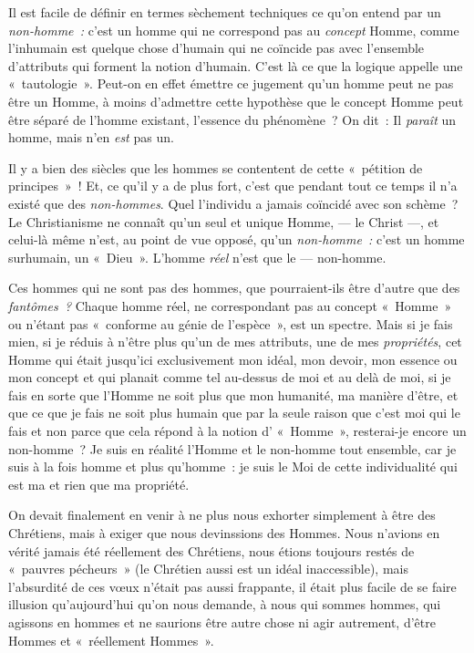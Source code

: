 \documentclass[french,twoside]{book} %
\begin{document}
Il est facile de définir en termes sèchement techniques ce qu’on entend par un \emph{non-homme :} c’est un homme qui ne correspond pas au \emph{concept} Homme, comme l’inhumain est quelque chose d’humain qui ne coïncide pas avec l’ensemble d’attributs qui forment la notion d’humain. C’est là ce que la logique appelle une « tautologie ». Peut-on en effet émettre ce jugement  qu’un homme peut ne pas être un Homme, à moins d’admettre cette hypothèse que le concept Homme peut être séparé de l’homme existant, l’essence du phénomène ? On dit : Il \emph{paraît} un homme, mais n’en \emph{est} pas un.\par
Il y a bien des siècles que les hommes se contentent de cette « pétition de principes » ! Et, ce qu’il y a de plus fort, c’est que pendant tout ce temps il n’a existé que des \emph{non-hommes}. Quel l’individu a jamais coïncidé avec son schème ? Le Christianisme ne connaît qu’un seul et unique Homme, — le Christ —, et celui-là même n’est, au point de vue opposé, qu’un \emph{non-homme :} c’est un homme surhumain, un « Dieu ». L’homme \emph{réel} n’est que le — non-homme.\par
Ces hommes qui ne sont pas des hommes, que pourraient-ils être d’autre que des \emph{fantômes ?} Chaque homme réel, ne correspondant pas au concept « Homme » ou n’étant pas « conforme au génie de l’espèce », est un spectre. Mais si je fais mien, si je réduis à n’être plus qu’un de mes attributs, une de mes \emph{propriétés}, cet Homme qui était jusqu’ici exclusivement mon idéal, mon devoir, mon essence ou mon concept et qui planait comme tel au-dessus de moi et au delà de moi, si je fais en sorte que l’Homme ne soit plus que mon humanité, ma manière d’être, et que ce que je fais ne soit plus humain que par la seule raison que c’est moi qui le fais et non parce que cela répond à la notion d’ « Homme », resterai-je encore un non-homme ? Je suis en réalité l’Homme et le non-homme tout ensemble, car je suis à la fois homme et plus qu’homme : je suis le Moi de cette individualité qui est ma et rien que ma propriété.\par
On devait finalement en venir à ne plus nous exhorter simplement à être des Chrétiens, mais à exiger que nous devinssions des Hommes. Nous n’avions en vérité jamais été réellement des Chrétiens, nous étions toujours restés de « pauvres pécheurs »  (le Chrétien aussi est un idéal inaccessible), mais l’absurdité de ces vœux n’était pas aussi frappante, il était plus facile de se faire illusion qu’aujourd’hui qu’on nous demande, à nous qui sommes hommes, qui agissons en hommes et ne saurions être autre chose ni agir autrement, d’être Hommes et « réellement Hommes ».\par
\end{document}
